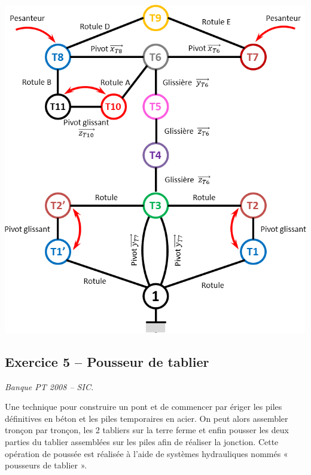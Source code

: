 \documentclass[10pt,fleqn]{article} %
\begin{document}
\begin{multicols}{2}
\begin{center}
\includegraphics[width=.8\linewidth]{images/fig_12.png}
\end{center}


%



\subsection*{Exercice 5 -- Pousseur de tablier}
\setcounter{exo}{0}
\begin{flushright}
\textit{Banque PT 2008 -- SIC.}
\end{flushright}

Une technique pour construire un pont et de commencer par ériger les piles définitives en béton et les piles
temporaires en acier. On peut alors assembler tronçon par tronçon, les 2 tabliers sur la terre ferme et enfin
pousser les deux parties du tablier assemblées sur les piles afin de réaliser la jonction.
Cette opération de poussée est réalisée à l’aide de systèmes hydrauliques nommés « pousseurs
de tablier ». 


\end{multicols}
\end{document}
